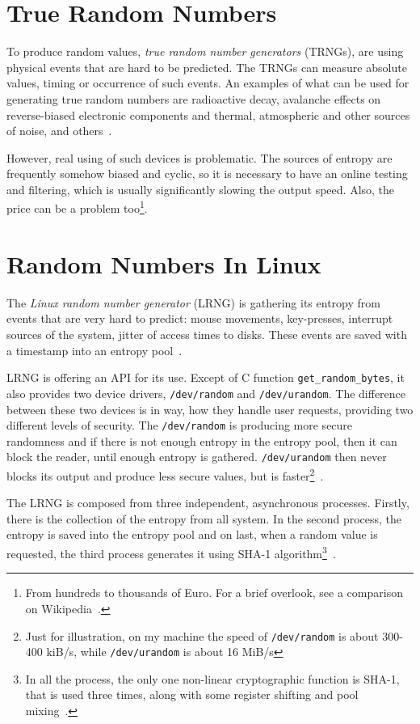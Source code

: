 \section{True Random Numbers}
To produce random values, {\em true random number generators} (TRNGs), are using physical events that are hard to be predicted. The TRNGs can measure absolute values, timing or occurrence of such events.
An examples of what can be used for generating true random numbers are radioactive decay, avalanche effects on reverse-biased electronic components and thermal, atmospheric and other sources of noise, and others~\cite[p.~6]{AnalysisOfEntropyLevels}.

However, real using of such devices is problematic. The sources of entropy are frequently somehow biased and cyclic, so it is necessary to have an online testing and filtering, which is usually significantly slowing the output speed. Also, the price can be a problem too\footnote{From hundreds to thousands of Euro. For a brief overlook, see a comparison on Wikipedia~\cite{HWRNGComparison}. }.


\section{Random Numbers In Linux}\label{sec:randomNumbers:linux}
The {\em Linux random number generator} (LRNG) is gathering its entropy from events that are very hard to predict: mouse movements, key-presses, interrupt sources of the system, jitter of access times to disks. These events are saved with a timestamp into an entropy pool~\cite{AnalysisOfLinuxRNG}.

LRNG is offering an API for its use. Except of C function {\tt get\_random\_bytes}, it also provides two device drivers, {\tt /dev/random} and {\tt /dev/urandom}. The difference between these two devices is in way, how they handle user requests, providing two different levels of security. The {\tt /dev/random} is producing more secure randomness and if there is not enough entropy in the entropy pool, then it can block the reader, until enough entropy is gathered. {\tt /dev/urandom} then never blocks its output and produce less secure values, but is faster\footnote{Just for illustration, on my machine the speed of {\tt /dev/random} is about 300-400 kiB/s, while {\tt /dev/urandom} is about 16 MiB/s}~\cite[chapter~1]{AnalysisOfLinuxRNG}. 

The LRNG is composed from three independent, asynchronous processes. Firstly, there is the collection of the entropy from all system. In the second process, the entropy is saved into the entropy pool and on last, when a random value is requested, the third process generates it using SHA-1 algorithm\footnote{In all the process, the only one non-linear cryptographic function is SHA-1, that is used three times, along with some register shifting and pool mixing~\cite[section~2.6]{AnalysisOfLinuxRNG}.}~\cite[chapter~2]{AnalysisOfLinuxRNG}.

